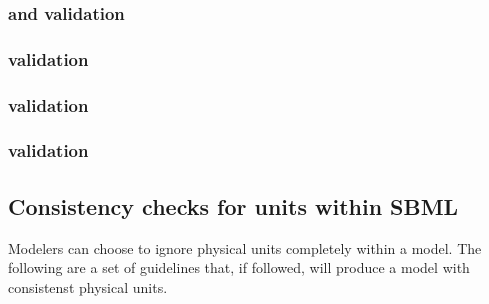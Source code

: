 \begin{sbmlenum}

\end{sbmlenum} \subsubsection*{ and  validation} \begin{sbmlenum}


\end{sbmlenum} \subsubsection*{ validation} \begin{sbmlenum}


\end{sbmlenum} \subsubsection*{ validation} \begin{sbmlenum}




\end{sbmlenum} \subsubsection*{ validation} \begin{sbmlenum}



\end{sbmlenum} 

\subsection{Consistency checks for units within SBML}

Modelers can choose to ignore physical units completely 
within a model.  The following are a set of guidelines that,
if followed, will produce a model with consistenst physical units.

